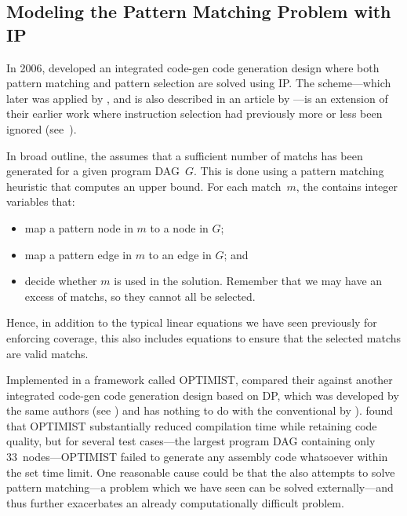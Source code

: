 \subsection{Modeling the Pattern Matching Problem with IP}

In 2006, \textcite{Bednarski2006} developed an \gls{integrated code-gen}
\gls{code generation} design where both \gls{pattern matching} and \gls{pattern
  selection} are solved using \glsdesc{IP}.
%
The scheme---which later was
applied by \textcite{Eriksson2008}, and is also described in an article by
\textcite{Eriksson2012}\unskip%
%
---is an extension of their earlier work where \gls{instruction selection} had
previously more or less been ignored (see~\cite{Kessler2001, Kessler2002}).

In broad outline, the \tIPmodel assumes that a sufficient number of
\glspl{match} has been generated for a given \gls{program DAG}~$G$.
%
This is done
using a \gls{pattern matching} heuristic that computes an upper bound.
%
For each
match~$m$, the \tIPmodel contains \glspl{integer variable} that:
\begin{itemize}
  \item map a \gls{pattern} \gls{node} in $m$ to a \gls{node} in $G$;
  \item map a \gls{pattern} \gls{edge} in $m$ to an \gls{edge} in $G$; and
  \item decide whether $m$ is used in the solution.
%
Remember that we may have an
    excess of \glspl{match}, so they cannot all be selected.
\end{itemize}
Hence, in addition to the typical linear equations we have seen previously for
enforcing coverage, this \tIPmodel also includes equations to ensure that the
selected \glspl{match} are valid \glspl{match}.

Implemented in a framework called \gls{OPTIMIST}, \citeauthor{Bednarski2006}
compared their \tIPmodel against another \gls{integrated code-gen} \gls{code
  generation} design based on \glsdesc{DP}, which was developed by the same
authors (see \cite{Kessler2001}) and has nothing to do with the conventional
\tDPalgorithm by \textcite{Aho1989}).
%
\citeauthor{Bednarski2006} found that
\gls{OPTIMIST} substantially reduced compilation time while retaining
code quality, but for several test cases---the largest \gls{program DAG}
containing only 33~\glspl{node}---\gls{OPTIMIST} failed to generate any
\gls{assembly code} whatsoever within the set time limit.
%
One reasonable cause
could be that the \tIPmodel also attempts to solve \gls{pattern matching}---a
problem which we have seen can be solved externally---and thus further
exacerbates an already computationally difficult problem.


